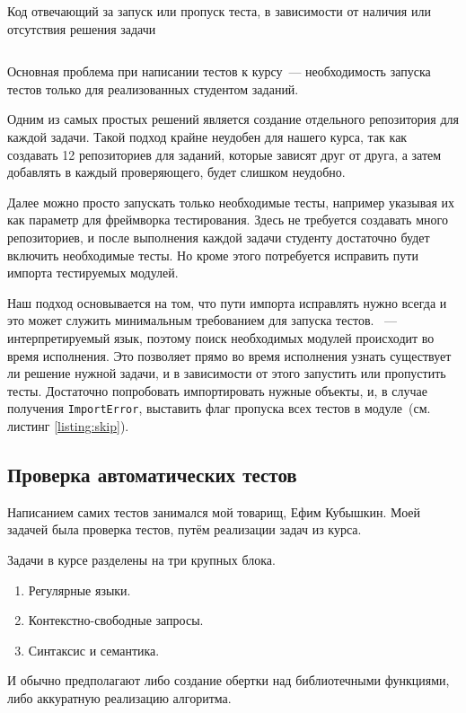 
\begin{listing}[b]
    \caption{Код отвечающий за запуск или пропуск теста, в зависимости от наличия или отсутствия решения задачи}
    \inputminted[linenos, breaklines, frame=single, fontsize = \small]{python3}{figures/minimal_example.py}
    \label{listing:skip}
\end{listing}

Основная проблема при написании тестов к курсу~--- необходимость запуска тестов только для реализованных студентом заданий.

Одним из самых простых решений является создание отдельного репозитория для каждой задачи.
Такой подход крайне неудобен для нашего курса, так как создавать 12 репозиториев для заданий, которые зависят друг от друга, а затем добавлять в каждый проверяющего, будет слишком неудобно.

Далее можно просто запускать только необходимые тесты, например указывая их как параметр для фреймворка тестирования.
Здесь не требуется создавать много репозиториев, и после выполнения каждой задачи студенту достаточно будет включить необходимые тесты.
Но кроме этого потребуется исправить пути импорта тестируемых модулей.

Наш подход основывается на том, что пути импорта исправлять нужно всегда и это может служить минимальным требованием для запуска тестов.
\python{}~--- интерпретируемый язык, поэтому поиск необходимых модулей происходит во время исполнения.
Это позволяет прямо во время исполнения узнать существует ли решение нужной задачи, и в зависимости от этого запустить или пропустить тесты.
Достаточно попробовать импортировать нужные объекты, и, в случае получения \texttt{ImportError}, выставить флаг пропуска всех тестов в модуле~(см. листинг \ref{listing:skip}).

\subsection{Проверка автоматических тестов}
\label{subsec:slns}

Написанием самих тестов занимался мой товарищ, Ефим Кубышкин.
Моей задачей была проверка тестов, путём реализации задач из курса.

Задачи в курсе разделены на три крупных блока.
\begin{enumerate}
    \item Регулярные языки.
    \item Контекстно-свободные запросы.
    \item Синтаксис и семантика.
\end{enumerate}
И обычно предполагают либо создание обертки над библиотечными функциями, либо аккуратную реализацию алгоритма.

